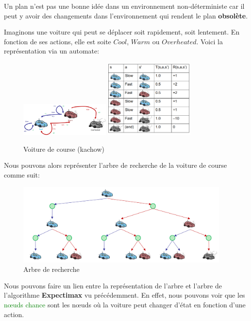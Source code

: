 \begin{remark}\leavevmode
    Un plan n'est pas une bonne idée dans un environnement non-déterministe car il peut y avoir des 
    changements dans l'environnement qui rendent le plan \textbf{obsolète}.
\end{remark}

\begin{example}\leavevmode
    Imaginons une voiture qui peut se déplacer soit rapidement, soit lentement. 
    En fonction de ses actions, elle est soite $Cool$, $Warm$ ou $Overheated$.
    Voici la représentation via un automate: 
    \begin{figure}[H]
        \centering
        \includegraphics[width=0.4\textwidth]{../pictures/automateracing.png}
        \hspace{2cm}
        \includegraphics[width=0.4\textwidth]{../pictures/tableracing.png}
        \caption{Voiture de course (kachow)}\label{fig:automateracing}
    \end{figure}

\end{example}

Nous pouvons alors représenter l'arbre de recherche de la voiture de course comme suit: 
\begin{figure}[H]
    \centering
    \includegraphics[width=0.95\textwidth]{../pictures/racingtree.png}
    \caption{Arbre de recherche}\label{fig:racingtree}
\end{figure}
Nous pouvons faire un lien entre la représentation de l'arbre et l'arbre de l'algorithme \textbf{Expectimax} 
vu précédemment. En effet, nous pouvons voir que les \textcolor{green}{nœuds chance} sont les nœuds où la voiture peut 
changer d'état en fonction d'une action.

